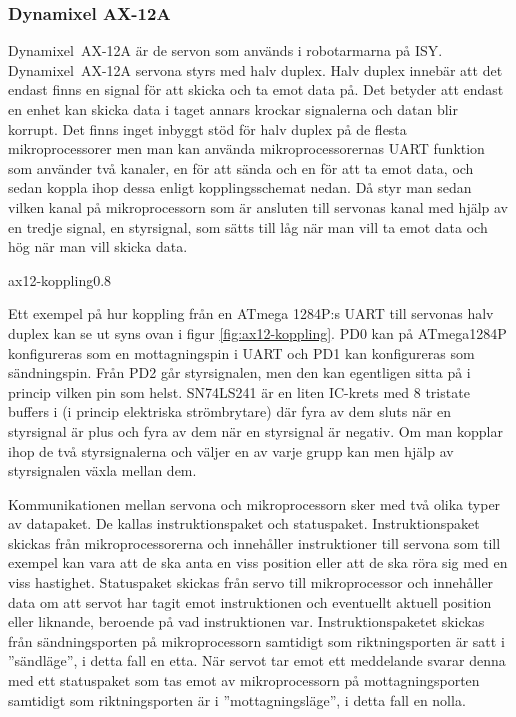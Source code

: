 \documentclass[a4paper,12pt]{article}
\begin{document}
\subsubsection{Dynamixel AX-12A}
 
Dynamixel~AX-12A är de servon som används i robotarmarna på ISY. Dynamixel~AX-12A servona styrs med halv duplex. Halv duplex innebär att det endast finns en signal för att skicka och ta emot data på. Det betyder att endast en enhet kan skicka data i taget annars krockar signalerna och datan blir korrupt. Det finns inget inbyggt stöd för halv duplex på de flesta mikroprocessorer men man kan använda mikroprocessorernas UART funktion som använder två kanaler, en för att sända och en för att ta emot data, och sedan koppla ihop dessa enligt kopplingsschemat nedan. Då styr man sedan vilken kanal på mikroprocessorn som är ansluten till servonas kanal med hjälp av en tredje signal, en styrsignal,  som sätts till låg när man vill ta emot data och hög när man vill skicka data. 
 
 {ax12-koppling}{0.8} 

Ett exempel på hur koppling från en ATmega 1284P:s UART till servonas halv duplex kan se ut syns ovan i figur \ref{fig:ax12-koppling}. PD0 kan på ATmega1284P konfigureras som en mottagningspin i UART och PD1 kan konfigureras som sändningspin. Från PD2 går styrsignalen, men den kan egentligen sitta på i princip vilken pin som helst. SN74LS241 är en liten IC-krets med 8 tristate buffers i (i princip elektriska strömbrytare) där fyra av dem sluts när en styrsignal är plus och fyra av dem när en styrsignal är negativ. Om man kopplar ihop de två styrsignalerna och väljer en av varje grupp kan men hjälp av styrsignalen växla mellan dem.\cite{dyn-manual}
 
Kommunikationen mellan servona och mikroprocessorn sker med två olika typer av datapaket. De kallas instruktionspaket och statuspaket. Instruktionspaket skickas från mikroprocessorerna och innehåller instruktioner till servona som till exempel kan vara att de ska anta en viss position eller att de ska röra sig med en viss hastighet. Statuspaket skickas från servo till mikroprocessor och innehåller data om att servot har tagit emot instruktionen och eventuellt aktuell position eller liknande, beroende på vad instruktionen var. Instruktionspaketet skickas från sändningsporten på mikroprocessorn samtidigt som riktningsporten är satt i ''sändläge'', i detta fall en etta. När servot tar emot ett meddelande svarar denna med ett statuspaket som tas emot av mikroprocessorn på mottagningsporten samtidigt som riktningsporten är i ''mottagningsläge'', i detta fall en nolla. 
\end{document}
